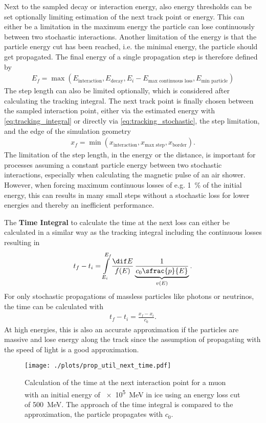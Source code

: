 Next to the sampled decay or interaction energy, also energy thresholds can be set optionally limiting estimation of the next track point or energy.
This can either be a limitation in the maximum energy the particle can lose continuously between two stochastic interactions.
Another limitation of the energy is that the particle energy cut has been reached, i.e. the minimal energy, the particle should get propagated.
The final energy of a single propagation step is therefore defined by
\begin{align}
    E_f = \max(E_{\text{interaction}}, E_{\text{decay}}, E_i - E_{\text{max continuous loss}}, E_{\text{min particle}})
\end{align}
The step length can also be limited optionally, which is considered after calculating the tracking integral.
The next track point is finally chosen between the sampled interaction point, either via the estimated energy with \eqref{eq:tracking_integral} or directly via \eqref{eq:tracking_stochastic}, the step limitation, and the edge of the simulation geometry
\begin{align}
    x_f = \min(x_{\text{interaction}}, x_{\text{max step}}, x_{\text{border}}) .
\end{align}
The limitation of the step length, in the energy or the distance, is important for processes assuming a constant particle energy between two stochastic interactions, especially when calculating the magnetic pulse of an air shower.
However, when forcing maximum continuous losses of e.g. \SI{1}{\%} of the initial energy, this can results in many small steps without a stochastic loss for lower energies and thereby an inefficient performance.

The \textbf{Time Integral} to calculate the time at the next loss can either be calculated in a similar way as the tracking integral including the continuous losses resulting in
\begin{align} \label{eq:time_integral}
    t_f - t_i = \int\limits_{E_i}^{E_f} \frac{\dif E}{f(E)} \underbrace{\frac{1}{c_0 \sfrac{p}{E}}}_{v(E)} .
\end{align}
For only stochastic propagations of massless particles like photons or neutrinos, the time can be calculated with
\begin{align}
    t_f - t_i = \frac{x_f - x_i}{c_0}.
\end{align}
At high energies, this is also an accurate approximation if the particles are massive and lose energy along the track since the assumption of propagating with the speed of light is a good approximation.
\begin{figure}
    \centering
    \texttt{[image: ./plots/prop\_util\_next\_time.pdf]}
    \caption{Calculation of the time at the next interaction point for a muon with an initial energy of \SI{e5}{MeV} in ice using an energy loss cut of \SI{500}{MeV}. The approach of the time integral is compared to the approximation, the particle propagates with $c_0$.}
    \label{fig:prop_util_time}
\end{figure}

